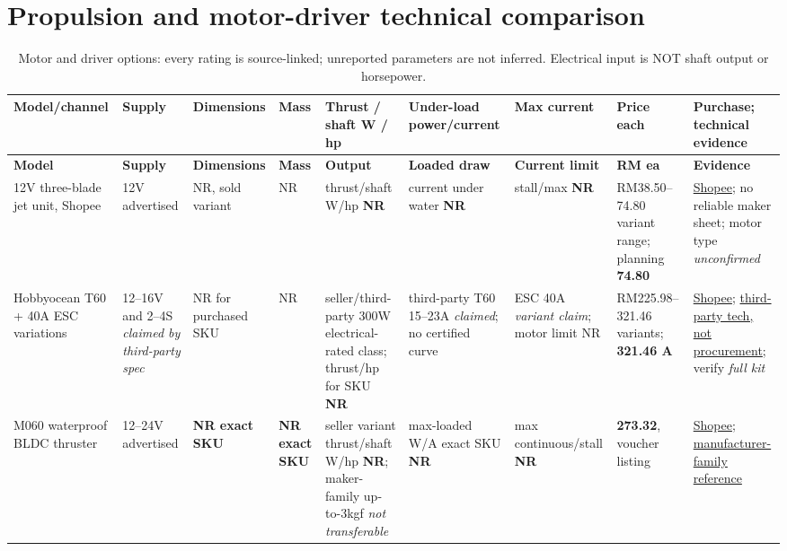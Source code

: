 \section{Propulsion and motor-driver technical comparison}
\begin{landscape}
\scriptsize\setlength{\tabcolsep}{2pt}
\begin{longtable}{L{25mm}L{21mm}L{22mm}L{23mm}L{30mm}L{36mm}L{31mm}L{23mm}L{32mm}}
\caption{Motor and driver options: every rating is source-linked; unreported parameters are not inferred. Electrical input is NOT shaft output or horsepower.}\label{tab:motor}\\
\toprule \textbf{Model/channel} & \textbf{Supply} & \textbf{Dimensions} & \textbf{Mass} & \textbf{Thrust / shaft W / hp} & \textbf{Under-load power/current} & \textbf{Max current} & \textbf{Price each} & \textbf{Purchase; technical evidence}\\\midrule\endfirsthead
\toprule \textbf{Model} & \textbf{Supply} & \textbf{Dimensions} & \textbf{Mass} & \textbf{Output} & \textbf{Loaded draw} & \textbf{Current limit} & \textbf{RM ea} & \textbf{Evidence}\\\midrule\endhead
\bottomrule\endfoot
12V three-blade jet unit, Shopee \cite{jetShop} & 12V advertised & NR, sold variant & NR & thrust/shaft W/hp \textbf{NR} & current under water \textbf{NR} & stall/max \textbf{NR} & RM38.50--74.80 variant range; planning \textbf{74.80} & \href{https://shopee.com.my/RC-Boat-12V-Jet-Boat-Underwater-3-blades-Propeller-Motor-Engine-Thruster-for-DIY-RC-ROV-Robot-Bait-Boat-Submarine-i.867757154.29083229097}{Shopee}; no reliable maker sheet; motor type \emph{unconfirmed} \\
Hobbyocean T60 + 40A ESC variations \cite{hobbyShop,hobbyRef} & 12--16V and 2--4S \emph{claimed by third-party spec} & NR for purchased SKU & NR & seller/third-party 300W electrical-rated class; thrust/hp for SKU \textbf{NR} & third-party T60 15--23A \emph{claimed}; no certified curve & ESC 40A \emph{variant claim}; motor limit NR & RM225.98--321.46 variants; \textbf{321.46 A} & \href{https://shopee.com.my/Hobbyocean-Underwater-Thruster-Combo-Brushless-Motor-16V-300W-With-40A-ESC-for-RC-Bait-Tug-Boat-Nest-Ship-Submarin-ROV-Robot-i.487084356.44255991724}{Shopee}; \href{https://www.daraz.com.bd/products/hobbyocean-underwater-thruster-16v-300w-brushless-motor-40a-esc-for-rc-bait-tug-boat-nest-ship-submarin-rov-robot-i571820375.html}{third-party tech, not procurement}; verify \emph{full kit} \\
M060 waterproof BLDC thruster \cite{m060Shop,m060Ref} & 12--24V advertised & \textbf{NR exact SKU} & \textbf{NR exact SKU} & seller variant thrust/shaft W/hp \textbf{NR}; maker-family up-to-3kgf \emph{not transferable} & max-loaded W/A exact SKU \textbf{NR} & max continuous/stall \textbf{NR} & \textbf{273.32}, voucher listing & \href{https://shopee.com.my/M060-200m-Deepwater-Thruster-Waterproof-Brushless-DC-Motor-ROV-Propulsor-12V-24V-Parts-for-RC-Unmanned-Ship-Underwater-Robot-i.133237764.45758558847}{Shopee}; \href{https://fulldepthrov.en.made-in-china.com/product/NAMpUOYlXFRr/China-M060-3kg-Max-Small-Compact-Thrust-Underwater-Brushless-Thruster-for-Underwater-Robot-Rov-Auv-Uuv.html}{manufacturer-family reference} \\

\end{longtable}
\end{landscape}

